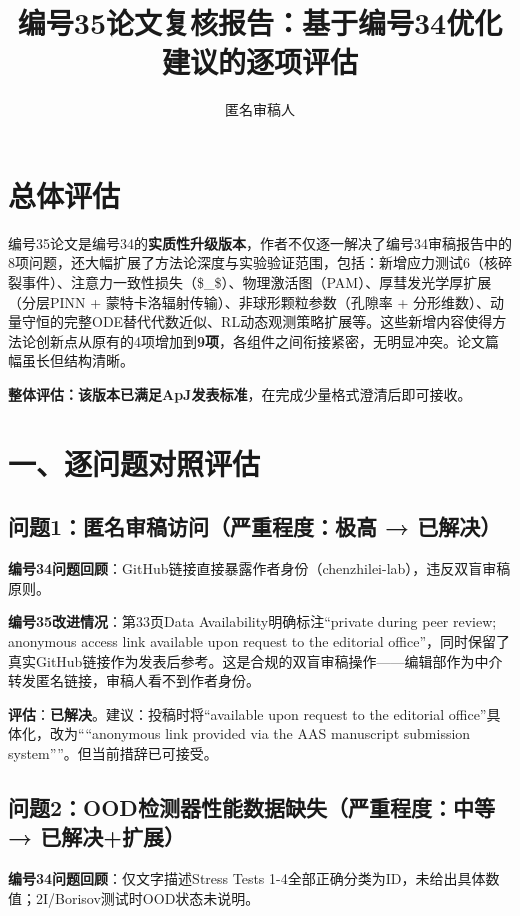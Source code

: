 \documentclass[12pt]{article}
\title{编号35论文复核报告：基于编号34优化建议的逐项评估}
\author{匿名审稿人}
\date{}
\begin{document}
\maketitle

\section*{总体评估}

编号35论文是编号34的\textbf{实质性升级版本}，作者不仅逐一解决了编号34审稿报告中的8项问题，还大幅扩展了方法论深度与实验验证范围，包括：新增应力测试6（核碎裂事件）、注意力一致性损失（\$_{}\$）、物理激活图（PAM）、厚彗发光学厚扩展（分层PINN + 蒙特卡洛辐射传输）、非球形颗粒参数（孔隙率 + 分形维数）、动量守恒的完整ODE替代代数近似、RL动态观测策略扩展等。这些新增内容使得方法论创新点从原有的4项增加到\textbf{9项}，各组件之间衔接紧密，无明显冲突。论文篇幅虽长但结构清晰。

\textbf{整体评估：该版本已满足ApJ发表标准}，在完成少量格式澄清后即可接收。

\section{一、逐问题对照评估}

\subsection{问题1：匿名审稿访问（严重程度：极高 → 已解决）}

\textbf{编号34问题回顾}：GitHub链接直接暴露作者身份（chenzhilei-lab），违反双盲审稿原则。

\textbf{编号35改进情况}：第33页Data Availability明确标注“private during peer review; anonymous access link available upon request to the editorial office”，同时保留了真实GitHub链接作为发表后参考。这是合规的双盲审稿操作——编辑部作为中介转发匿名链接，审稿人看不到作者身份。

\textbf{评估}：\textbf{已解决}。建议：投稿时将“available upon request to the editorial office”具体化，改为“``anonymous link provided via the AAS manuscript submission system''”。但当前措辞已可接受。

\subsection{问题2：OOD检测器性能数据缺失（严重程度：中等 → 已解决+扩展）}

\textbf{编号34问题回顾}：仅文字描述Stress Tests 1-4全部正确分类为ID，未给出具体数值；2I/Borisov测试时OOD状态未说明。
\end{document}
